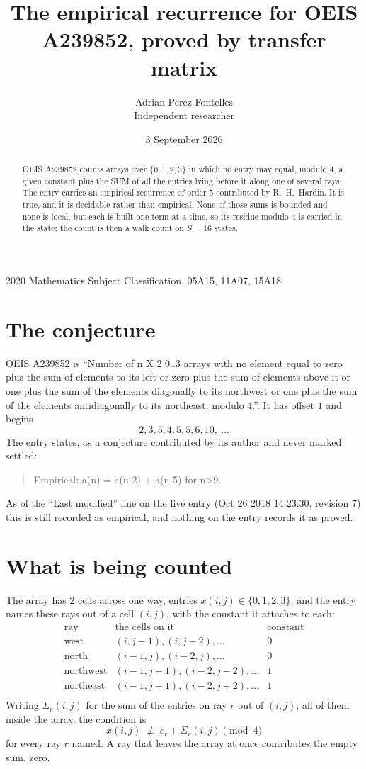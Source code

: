\documentclass[11pt,a4paper]{article}
\title{The empirical recurrence for OEIS A239852, proved by transfer matrix}
\author{Adrian Perez Fontelles\\ \small Independent researcher}
\date{3 September 2026}
\theoremstyle{plain}
\theoremstyle{definition}
\begin{document}
\maketitle

\begin{abstract}
OEIS A239852 counts arrays over $\{0,1,2,3\}$ in which no entry may equal, modulo $4$, a given
constant plus the SUM of all the entries lying before it along one of several rays. The entry
carries an empirical recurrence of order $5$ contributed by R.~H.~Hardin. It is true, and
it is decidable rather than empirical. None of those sums is bounded and none is local, but
each is built one term at a time, so its residue modulo $4$ is carried in the state; the
count is then a walk count on $S=16$ states.
\end{abstract}

\noindent\small 2020 Mathematics Subject Classification. 05A15, 11A07, 15A18.\normalsize

\section{The conjecture}

OEIS A239852 is ``Number of n X 2 0..3 arrays with no element equal to zero plus the sum of elements to its left or zero plus the sum of elements above it or one plus the sum of the elements diagonally to its northwest or one plus the sum of the elements antidiagonally to its northeast, modulo 4.''. It has offset $1$ and begins
\[
2, 3, 5, 4, 5, 5, 6, 10,\ \dots
\]
The entry states, as a conjecture contributed by its author and never marked settled:
\begin{quote}
Empirical: a(n) = a(n-2) + a(n-5) for n>9.
\end{quote}
As of the ``Last modified'' line on the live entry (Oct 26 2018 14:23:30, revision 7) this is still
recorded as empirical, and nothing on the entry records it as proved.

\section{What is being counted}

The array has $2$ cells across one way, entries $x(i,j)\in\{0,1,2,3\}$, and the entry names these
rays out of a cell $(i,j)$, with the constant it attaches to each:
\[
\begin{array}{lll}
\text{ray} & \text{the cells on it} & \text{constant} \\[2pt]
\text{west} & (i,j-1),(i,j-2),\dots & 0 \\
\text{north} & (i-1,j),(i-2,j),\dots & 0 \\
\text{northwest} & (i-1,j-1),(i-2,j-2),\dots & 1 \\
\text{northeast} & (i-1,j+1),(i-2,j+2),\dots & 1 \\
\end{array}
\]
Writing $\Sigma_r(i,j)$ for the sum of the entries on ray $r$ out of $(i,j)$, all of them
inside the array, the condition is
\[
x(i,j)\;\not\equiv\;c_r+\Sigma_r(i,j) \pmod{4}
\]
for every ray $r$ named. A ray that leaves the array at once contributes the empty sum,
zero.
\end{document}
